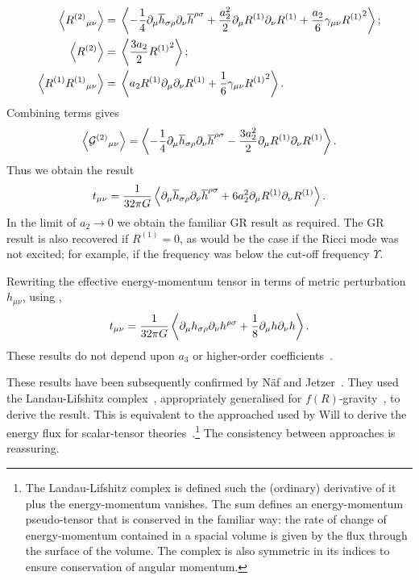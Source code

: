 \begin{align}
\left\langle {R^{(2)}}_{\mu\nu} \right\rangle = {} & \left\langle -\frac{1}{4} \partial_\mu\overline{h}_{\sigma\rho}\partial_\nu\overline{h}^{\rho\sigma} + \frac{a_2^2}{2}\partial_\mu R^{(1)}\partial_\nu R^{(1)} + \frac{a_2}{6}\gamma_{\mu\nu} {R^{(1)}}^2 \right\rangle; \\
\left\langle R^{(2)} \right\rangle = {} & \left\langle \frac{3a_2}{2}{R^{(1)}}^2 \right\rangle; \\
\left\langle R^{(1)}{R^{(1)}}_{\mu\nu} \right\rangle = {} & \left\langle a_2 R^{(1)} \partial_\mu\partial_\nu R^{(1)} + \frac{1}{6}\gamma_{\mu\nu}{R^{(1)}}^2\right\rangle.
\end{align}
Combining terms gives
\begin{equation}
\left\langle {\mathcal{G}^{(2)}}_{\mu\nu}\right\rangle = \left\langle -\frac{1}{4} \partial_\mu\overline{h}_{\sigma\rho}\partial_\nu\overline{h}^{\rho\sigma} - \frac{3a_2^2}{2}\partial_\mu R^{(1)}\partial_\nu R^{(1)} \right\rangle.
\end{equation}
Thus we obtain the result
\begin{equation}
t_{\mu\nu} = \frac{1}{32\pi G}\left\langle \partial_\mu\overline{h}_{\sigma\rho}\partial_\nu\overline{h}^{\rho\sigma} + 6a_2^2\partial_\mu R^{(1)}\partial_\nu R^{(1)} \right\rangle.
\label{eq:Pseudotensor}
\end{equation}
In the limit of $a_2 \rightarrow 0$ we obtain the familiar GR result as required. The GR result is also recovered if $R^{(1)} = 0$, as would be the case if the Ricci mode was not excited; for example, if the frequency was below the cut-off frequency $\Upsilon$.

Rewriting the effective energy-momentum tensor in terms of metric perturbation $h_{\mu\nu}$, using ,
\begin{equation}
t_{\mu\nu} = \frac{1}{32\pi G}\left\langle \partial_\mu h_{\sigma\rho}\partial_\nu h^{\rho\sigma} + \frac{1}{8}\partial_\mu h \partial_\nu h \right\rangle.
\end{equation}
These results do not depend upon $a_3$ or higher-order coefficients~\cite{Stein2011}.

These results have been subsequently confirmed by N\"af and Jetzer~\cite{Naf2011}. They used the Landau-Lifshitz complex~\cite{Landau1975}, appropriately generalised for $f(R)$-gravity~\cite{Nutku1969}, to derive the result. This is equivalent to the approached used by Will to derive the energy flux for scalar-tensor theories~\cite{Will1993}.\footnote{The Landau-Lifshitz complex is defined such the (ordinary) derivative of it plus the energy-momentum vanishes. The sum defines an energy-momentum pseudo-tensor that is conserved in the familiar way: the rate of change of energy-momentum contained in a spacial volume is given by the flux through the surface of the volume. The complex is also symmetric in its indices to ensure conservation of angular momentum.} The consistency between approaches is reassuring.

